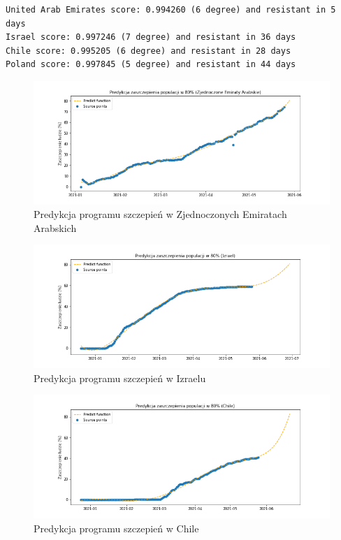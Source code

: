 \documentclass[12pt, oneside]{article}
\begin{document}
\begin{Verbatim}[tabsize=4]
United Arab Emirates score: 0.994260 (6 degree) and resistant in 5 days
Israel score: 0.997246 (7 degree) and resistant in 36 days
Chile score: 0.995205 (6 degree) and resistant in 28 days
Poland score: 0.997845 (5 degree) and resistant in 44 days
\end{Verbatim}

\begin{figure}[h!]
\centering
\includegraphics[height=0.27\textheight]{../img/ZEA_predict.png} 
\caption{Predykcja programu szczepień w Zjednoczonych Emiratach Arabskich}
\end{figure}

\begin{figure}[h!]
\centering
\includegraphics[height=0.27\textheight]{../img/IS_predict.png} 
\caption{Predykcja programu szczepień w Izraelu}
\end{figure}

\begin{figure}[h!]
\centering
\includegraphics[height=0.27\textheight]{../img/CHI_predict.png} 
\caption{Predykcja programu szczepień w Chile}
\end{figure}
\end{document}
